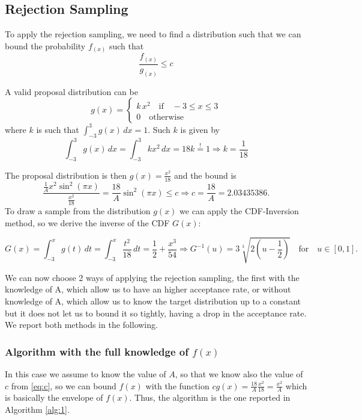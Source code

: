 \documentclass[a4paper,12pt]{article}
\begin{document}
\subsection*{Rejection Sampling}
To apply the rejection sampling, we need to find a distribution such that we can bound the probability $f_(x)$ such that
\begin{equation*}
   \frac{f_(x)}{g_(x)} \leq c
\end{equation*}

A valid proposal distribution can be
\begin{equation*}
g(x) = \begin{cases}
    k \, x^2 \quad \text{if} \quad -3\leq x\leq3 \\
    0 \quad \text{otherwise}
    \end{cases} 
\end{equation*}
where $k$ is such that $\int_{-3}^{3} g(x) \, dx =1$.
Such $k$ is given by
\begin{equation*}
\int_{-3}^{3} g(x) \, dx =\int_{-3}^{3} kx^2 \, dx =  18k \overset{!}{=} 1 \Rightarrow k = \frac{1}{18}
\end{equation*}

The proposal distribution is then $g(x) = \frac{x^2}{18}$ and the bound is 
\begin{equation}
\label{eq:c}
    \frac{\frac{1}{A}x^2\sin^2(\pi x)}{\frac{x^2}{18}} = \frac{18}{A}\sin^2(\pi x) \leq c \Rightarrow c = \frac{18}{A} = 2.03435386.
\end{equation}
To draw a sample from the distribution $g(x)$ we can apply the CDF-Inversion method, so we derive the inverse of the CDF $G(x)$:

\begin{equation*}
    G(x) = \int_{-3}^{x}g(t)\,dt = \int_{-3}^{x} \frac{t^2}{18}\,dt = \frac{1}{2}+\frac{x^3}{54}
    \Rightarrow G^{-1}(u) = 3\sqrt[3]{2(u-\frac{1}{2})} \quad \text{for}\quad u \in [0,1].   
\end{equation*}

We can now choose 2 ways of applying the rejection sampling, the first with the knowledge of A, which allow us to have an higher acceptance rate, or without knowledge of A, which allow us to know the target distribution up to a constant but it does not let us to bound it so tightly, having a drop in the acceptance rate. We report both methods in the following.

\subsubsection*{Algorithm with the full knowledge of $f(x)$}
In this case we assume to know the value of $A$, so that we know also the value of $c$ from \ref{eq:c}, so we can bound $f(x)$ with the function $cg(x) = \frac{18}{A}\frac{x^2}{18} =\frac{x^2}{A}$ which is basically the envelope of $f(x)$.
Thus, the algorithm is the one reported in Algorithm \ref{alg:1}.
\end{document}
